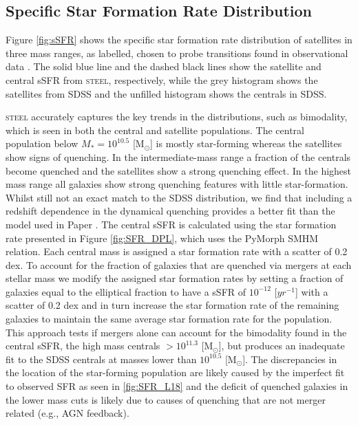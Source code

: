 \subsection{Specific Star Formation Rate Distribution}
\label{subsec:sSFR}

Figure \ref{fig:sSFR} shows the specific star formation rate distribution of satellites in three mass ranges, as labelled, chosen to probe transitions found in observational data \citep{Bernardi2011EvidenceRelations, Bernardi2014SystematicMorphology, Cappellari2013TheFunction}. The solid blue line and the dashed black lines show the satellite and central sSFR from \textsc{steel}, respectively, while the grey histogram shows the satellites from SDSS and the unfilled histogram shows the centrals in SDSS. 

\textsc{steel} accurately captures the key trends in the distributions, such as bimodality, which is seen in both the central and satellite populations. The central population below $M_{*} = 10^{10.5}$ [M$_{\odot}$] is mostly star-forming whereas the satellites show signs of quenching. In the intermediate-mass range a fraction of the centrals become quenched and the satellites show a strong quenching effect. In the highest mass range all galaxies show strong quenching features with little star-formation. Whilst still not an exact match to the SDSS distribution, we find that including a redshift dependence in the dynamical quenching provides a better fit than the model used in Paper . The central sSFR is calculated using the star formation rate presented in Figure \ref{fig:SFR_DPL}, which uses the PyMorph SMHM relation. Each central mass is assigned a star formation rate with a scatter of 0.2 dex. To account for the fraction of galaxies that are quenched via mergers at each stellar mass we modify the assigned star formation rates by setting a fraction of galaxies equal to the elliptical fraction to have a sSFR of $10^{-12}$ [$yr^{-1}$] with a scatter of 0.2 dex and in turn increase the star formation rate of the remaining galaxies to maintain the same average star formation rate for the population. This approach tests if mergers alone can account for the bimodality found in the central sSFR, the high mass centrals $ > 10^{11.3}$ [M$_{\odot}$], but produces an inadequate fit to the SDSS centrals at masses lower than $10^{10.5}$ [M$_{\odot}$]. The discrepancies in the location of the star-forming population are likely caused by the imperfect fit to observed SFR as seen in \ref{fig:SFR_L18} and the deficit of quenched galaxies in the lower mass cuts is likely due to causes of quenching that are not merger related (e.g., AGN feedback).

